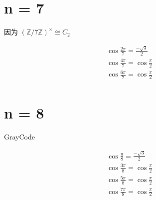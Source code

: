 \chapter{n = 7}\label{ch:cos7}

因为 $(\mathbb{Z}/7\mathbb{Z})^{×}≅C_2 $

$$
\begin{aligned}
    \cos\frac{2π}{7} = \frac{-\sqrt{3}}{2}\\
    \cos\frac{4π}{7} = \cos\frac{π}{2}\\
    \cos\frac{6π}{7} = \cos\frac{π}{2}\\
\end{aligned}
$$


\chapter{n = 8}\label{ch:cos8}

GrayCode

$$
\begin{aligned}
    \cos\frac{ π}{8} = \frac{-\sqrt{3}}{2}\\
    \cos\frac{3π}{8} = \cos\frac{π}{2}\\
    \cos\frac{5π}{8} = \cos\frac{π}{2}\\
    \cos\frac{7π}{8} = \cos\frac{π}{2}\\
\end{aligned}
$$

